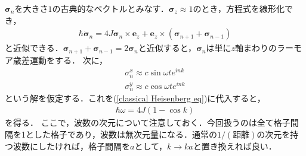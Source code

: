 \documentclass[../main.tex]{subfiles}
\begin{document}
\begin{frame}{}
    $\bm{\sigma}_n$を大きさ$1$の古典的なベクトルとみなす．$\bm{\sigma}_z \approx 1$のとき，方程式を線形化でき，
    \begin{align}
        \hbar \dot{\bm{\sigma}}_n = 4J \bm{\sigma}_n \times \bm{e}_z + \bm{e}_z \times (\bm{\sigma}_{n+1} + \bm{\sigma}_{n-1})
        \label{classical Heisenberg eq}
    \end{align}
    と近似できる．$\bm{\sigma}_{n+1}+\bm{\sigma}_{n-1}= 2\bm{\sigma}_n$と近似すると，$\bm{\sigma}_n$は単に$z$軸まわりのラーモア歳差運動をする．
    次に，
    \begin{align}
        \sigma_n^x \approx c\sin\omega t e^{ink}
        \\
        \sigma_n^y \approx c\cos\omega t e^{ink}
    \end{align}
    という解を仮定する．これを(\ref{classical Heisenberg eq})に代入すると，
    \begin{align}
        \hbar\omega = 4J(1- \cos k)
    \end{align}
    を得る．
    ここで，波数の次元について注意しておく．今回扱うのは全て格子間隔を1とした格子であり，波数は無次元量になる．通常の$1/(\text{距離})$の次元を持つ波数にしたければ，格子間隔を$a$として，$k \to ka$と置き換えれば良い．
\end{frame}

\end{document}
